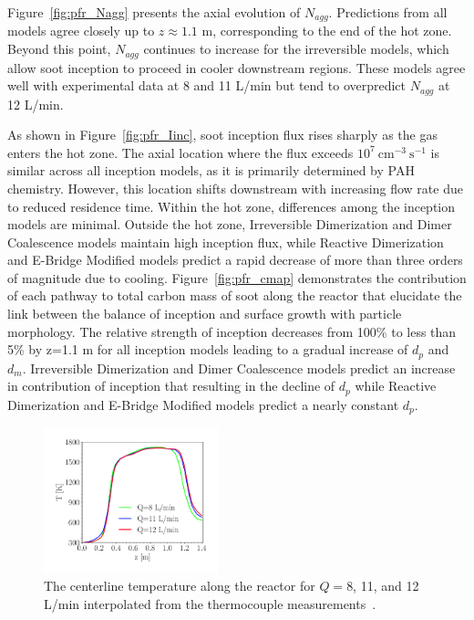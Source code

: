 Figure~\ref{fig:pfr_Nagg} presents the axial evolution of $N_{agg}$. Predictions from all models agree closely up to $z \approx 1.1$ m, corresponding to the end of the hot zone. Beyond this point, $N_{agg}$ continues to increase for the irreversible models, which allow soot inception to proceed in cooler downstream regions. These models agree well with experimental data at 8 and 11 L/min but tend to overpredict $N_{agg}$ at 12 L/min.

As shown in Figure~\ref{fig:pfr_Iinc}, soot inception flux rises sharply as the gas enters the hot zone. The axial location where the flux exceeds $10^7~\mathrm{cm^{-3}~s^{-1}}$ is similar across all inception models, as it is primarily determined by PAH chemistry. However, this location shifts downstream with increasing flow rate due to reduced residence time. Within the hot zone, differences among the inception models are minimal. Outside the hot zone, Irreversible Dimerization and Dimer Coalescence models maintain high inception flux, while Reactive Dimerization and E-Bridge Modified models predict a rapid decrease of more than three orders of magnitude due to cooling. Figure~\ref{fig:pfr_cmap} demonstrates the contribution of each pathway to total carbon mass of soot along the reactor that elucidate the link between the balance of inception and surface growth with particle morphology. The relative strength of inception decreases from 100\% to less than 5\% by z=1.1 m for all inception models leading to a gradual increase of $d_p$ and $d_m$. Irreversible Dimerization and Dimer Coalescence models predict an increase in contribution of inception that resulting in the decline of $d_p$ while Reactive Dimerization and E-Bridge Modified models predict a nearly constant $d_p$.


\begin{figure}[H]
	\centering
	\includegraphics[width=0.45\textwidth]{Figures/Results/PFR/temperature_combined.pdf}
	\caption{The centerline temperature along the reactor for $Q=$8, 11, and 12 L/min interpolated from the thermocouple measurements~\citep{mei2019quantitative}.}
	\label{fig:pfr_temp} 
\end{figure}

